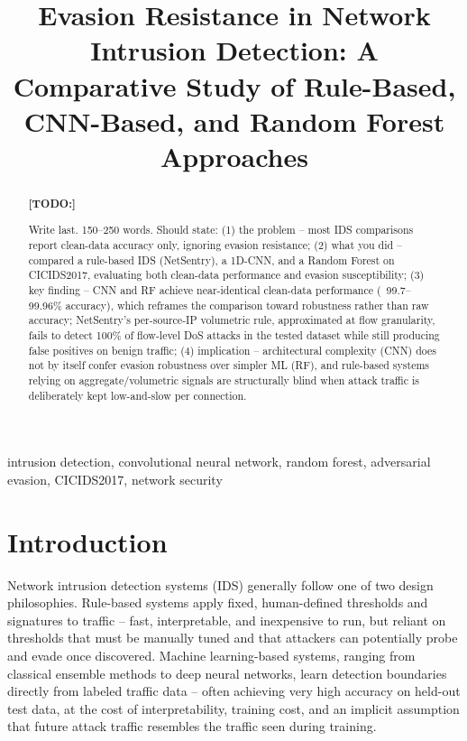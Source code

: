 \documentclass[conference]{IEEEtran}
\newenvironment{todo}
  {\par\noindent\color{red}\bfseries[TODO:]\normalfont\color{red}\begin{itshape}}
  {\end{itshape}\par\normalfont\color{black}}
\begin{document}
 
\title{Evasion Resistance in Network Intrusion Detection: A Comparative Study of Rule-Based, CNN-Based, and Random Forest Approaches}
 
\author{
}
 
\maketitle
 
\begin{abstract}
\begin{todo}
Write last. 150--250 words. Should state: (1) the problem -- most IDS comparisons report clean-data accuracy only, ignoring evasion resistance; (2) what you did -- compared a rule-based IDS (NetSentry), a 1D-CNN, and a Random Forest on CICIDS2017, evaluating both clean-data performance and evasion susceptibility; (3) key finding -- CNN and RF achieve near-identical clean-data performance (~99.7--99.96\% accuracy), which reframes the comparison toward robustness rather than raw accuracy; NetSentry's per-source-IP volumetric rule, approximated at flow granularity, fails to detect 100\% of flow-level DoS attacks in the tested dataset while still producing false positives on benign traffic; (4) implication -- architectural complexity (CNN) does not by itself confer evasion robustness over simpler ML (RF), and rule-based systems relying on aggregate/volumetric signals are structurally blind when attack traffic is deliberately kept low-and-slow per connection.
\end{todo}
\end{abstract}
 
\begin{IEEEkeywords}
intrusion detection, convolutional neural network, random forest, adversarial evasion, CICIDS2017, network security
\end{IEEEkeywords}
 
\section{Introduction}
Network intrusion detection systems (IDS) generally follow one of two design philosophies. Rule-based systems apply fixed, human-defined thresholds and signatures to traffic -- fast, interpretable, and inexpensive to run, but reliant on thresholds that must be manually tuned and that attackers can potentially probe and evade once discovered. Machine learning-based systems, ranging from classical ensemble methods to deep neural networks, learn detection boundaries directly from labeled traffic data -- often achieving very high accuracy on held-out test data, at the cost of interpretability, training cost, and an implicit assumption that future attack traffic resembles the traffic seen during training.
 
\end{document}

